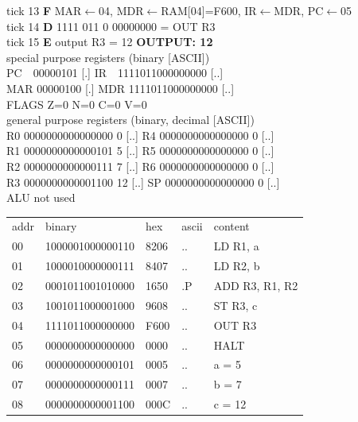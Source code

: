 \noindent\begin{tcolorbox}[stepbox, title={Instruction 5 \hfill ticks 13 to 15 \quad OUT R3}]
\textcolor{dim}{tick 13} \textbf{F} MAR$\leftarrow$04, MDR$\leftarrow$RAM[04]=F600, IR$\leftarrow$MDR, PC$\leftarrow$05\\
\textcolor{dim}{tick 14} \textbf{D} 1111 011 0 00000000 = OUT R3\\
\textcolor{dim}{tick 15} \textbf{E} output R3 = 12 \hfill \colorbox{outc}{\textbf{OUTPUT: 12}}\\[2pt]
\textcolor{dim}{special purpose registers (binary [ASCII])}\\
PC~~00000101 [.] \hfill IR~~1111011000000000 [..]\\
MAR 00000100 [.] \hfill MDR 1111011000000000 [..]\\
FLAGS Z=0 N=0 C=0 V=0\\[2pt]
\textcolor{dim}{general purpose registers (binary, decimal [ASCII])}\\
R0 0000000000000000 0 [..] \hfill R4 0000000000000000 0 [..]\\
R1 0000000000000101 5 [..] \hfill R5 0000000000000000 0 [..]\\
R2 0000000000000111 7 [..] \hfill R6 0000000000000000 0 [..]\\
R3 0000000000001100 12 [..] \hfill SP 0000000000000000 0 [..]\\
\textcolor{dim}{ALU not used}\\[2pt]
{\setlength{\tabcolsep}{2pt}\begin{tabular}{@{}lllll@{}}
\textcolor{dim}{addr} & \textcolor{dim}{binary} & \textcolor{dim}{hex} & \textcolor{dim}{ascii} & \textcolor{dim}{content}\\
00 & 1000001000000110 & 8206 & .. & LD R1, a\\
01 & 1000010000000111 & 8407 & .. & LD R2, b\\
02 & 0001011001010000 & 1650 & .P & ADD R3, R1, R2\\
03 & 1001011000001000 & 9608 & .. & ST R3, c\\
04 & 1111011000000000 & F600 & .. & OUT R3\\
\rowcolor{pcc}05 & 0000000000000000 & 0000 & .. & HALT\\
\rowcolor{datac}06 & 0000000000000101 & 0005 & .. & a = 5\\
\rowcolor{datac}07 & 0000000000000111 & 0007 & .. & b = 7\\
\rowcolor{datac}08 & 0000000000001100 & 000C & .. & c = 12\\

\end{tabular}}
\end{tcolorbox}
